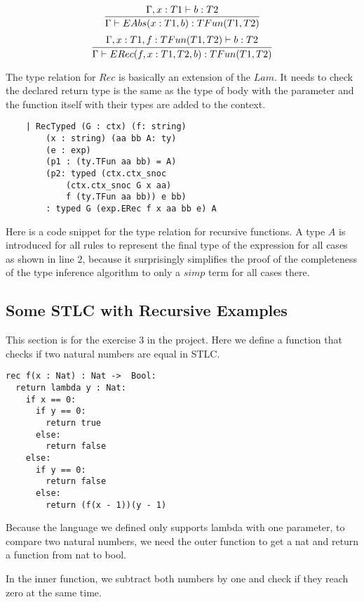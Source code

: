 \documentclass[conference]{IEEEtran}
\begin{document}
\begin{equation}
	\infer{\Gamma\vdash EAbs(x:T1, b):TFun(T1, T2)}
	{\Gamma,x:T1\vdash b:T2}
	\label{eq:TIAbs}
\end{equation}
\begin{equation}
	\infer{\Gamma\vdash ERec(f, x:T1, T2, b):TFun(T1, T2)}
	{\Gamma,x:T1,f:TFun(T1,T2)\vdash b:T2}
	\label{eq:TIRec}
\end{equation}

The type relation for $Rec$ is basically an extension of the $Lam$.
It needs to check the declared return type is the same as the type of
body with the parameter and the function itself with their types are added to the context.

\begin{lstlisting}
    | RecTyped (G : ctx) (f: string) 
        (x : string) (aa bb A: ty) 
        (e : exp) 
        (p1 : (ty.TFun aa bb) = A) 
        (p2: typed (ctx.ctx_snoc 
            (ctx.ctx_snoc G x aa) 
            f (ty.TFun aa bb)) e bb) 
        : typed G (exp.ERec f x aa bb e) A
\end{lstlisting}

Here is a code snippet for the type relation for recursive functions.
A type $A$ is introduced for all rules to represent the final type of
the expression for all cases as shown in line $2$,
because it surprisingly simplifies the
proof of the completeness of the type inference algorithm to only a $simp$
term for all cases there.

\subsection{Some STLC with Recursive Examples}
This section is for the exercise $3$ in the project.
Here we define a function that checks if two natural numbers are equal in STLC.

\begin{lstlisting}
rec f(x : Nat) : Nat ->  Bool:
  return lambda y : Nat:
    if x == 0:
      if y == 0:
        return true
      else:
        return false
    else:
      if y == 0:
        return false
      else:
        return (f(x - 1))(y - 1)
\end{lstlisting}
Because the language we defined only supports lambda with one parameter,
to compare two natural numbers, we need the outer function to get a nat
and return a function from nat to bool.

In the inner function, we subtract both numbers by one and check if they
reach zero at the same time.
\end{document}
